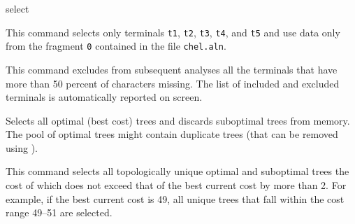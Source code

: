 \begin{command}{select}{}
	\begin{poyexamples}
        
        
            {This command selects only terminals \texttt{t1},  \texttt{t2},
             \texttt{t3},  \texttt{t4}, and  \texttt{t5} and use data only from the
              fragment  \texttt{0} contained in the file \texttt{chel.aln}.}
	
	{This command excludes from subsequent analyses all the terminals that
	have more than 50 percent of characters missing. The list of included and excluded
	terminals is automatically reported on screen.}
	
            {Selects all optimal (best cost) trees and discards suboptimal trees from
            memory. The pool of optimal trees might contain duplicate trees (that can
            be removed using ).}
            
	{This command selects all topologically unique optimal and suboptimal trees
	the cost of which does not exceed that of the best current cost by more than
	2. For example, if the best current cost is 49, all unique trees that fall within
	the cost range 49--51 are selected.}
	
	\end{poyexamples}

	\begin{poyalso}
	\end{poyalso}

\end{command}

